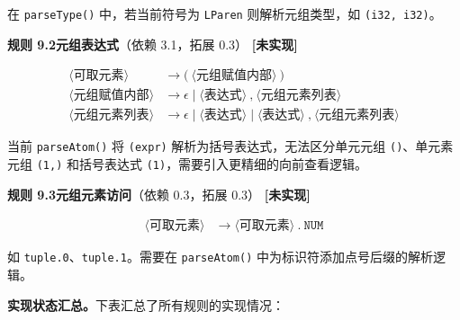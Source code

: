 \documentclass[12pt,a4paper]{ctexart}
\begin{document}
在 \texttt{parseType()} 中，若当前符号为 \texttt{LParen} 则解析元组类型，如 \texttt{(i32, i32)}。

\textbf{规则 9.2\quad 元组表达式}（依赖 3.1，拓展 0.3） \hfill \textcolor{red!70!black}{\textbf{[未实现]}}

\begin{align}
\langle\text{可取元素}\rangle &\rightarrow \texttt{(} \ \langle\text{元组赋值内部}\rangle \ \texttt{)} \\
\langle\text{元组赋值内部}\rangle &\rightarrow \epsilon \mid \langle\text{表达式}\rangle \ \texttt{,} \ \langle\text{元组元素列表}\rangle \\
\langle\text{元组元素列表}\rangle &\rightarrow \epsilon \mid \langle\text{表达式}\rangle \mid \langle\text{表达式}\rangle \ \texttt{,} \ \langle\text{元组元素列表}\rangle
\end{align}

当前 \texttt{parseAtom()} 将 \texttt{(expr)} 解析为括号表达式，无法区分单元元组 \texttt{()}、单元素元组 \texttt{(1,)} 和括号表达式 \texttt{(1)}，需要引入更精细的向前查看逻辑。

\textbf{规则 9.3\quad 元组元素访问}（依赖 0.3，拓展 0.3） \hfill \textcolor{red!70!black}{\textbf{[未实现]}}

\begin{align}
\langle\text{可取元素}\rangle &\rightarrow \langle\text{可取元素}\rangle \ \texttt{.} \ \texttt{NUM}
\end{align}

如 \texttt{tuple.0}、\texttt{tuple.1}。需要在 \texttt{parseAtom()} 中为标识符添加点号后缀的解析逻辑。

\textbf{实现状态汇总。}下表汇总了所有规则的实现情况：
\end{document}
